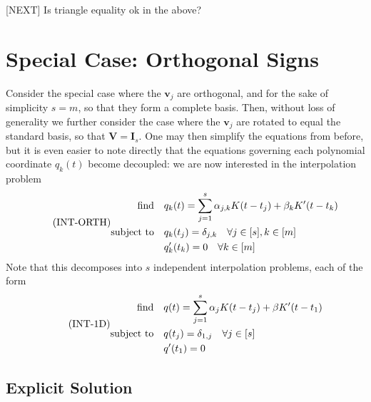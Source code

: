 \documentclass[11pt]{article}
\newcommand{\HS}{\hspace{3.5mm}}
\newcommand{\bV}{\bm V}
\newcommand{\bv}{\bm v}
\begin{document}
[NEXT] Is triangle equality ok in the above?

\section{Special Case: Orthogonal Signs}

Consider the special case where the $\bv_j$ are orthogonal, and for the sake of simplicity $s = m$, so that they form a complete basis.
Then, without loss of generality we further consider the case where the $\bv_j$ are rotated to equal the standard basis, so that $\bV = \bm I_s$.
One may then simplify the equations from before, but it is even easier to note directly that the equations governing each polynomial coordinate $q_k(t)$ become decoupled: we are now interested in the interpolation problem
\begin{equation}
    \tag{INT-ORTH}
    \begin{aligned}
  \text{find} &\HS q_k(t) = \sum_{j = 1}^s \alpha_{j, k} K(t - t_j) + \beta_kK^\prime(t - t_k) \\
  \text{subject to} &\HS q_k(t_j) = \delta_{j, k} \HS \forall j \in [s], k \in [m] \\
  &\HS q_k^\prime(t_k) = 0 \HS \forall k \in [m]
\end{aligned}
\end{equation}
Note that this decomposes into $s$ independent interpolation problems, each of the form
\begin{equation}
    \tag{INT-1D}
    \begin{aligned}
  \text{find} &\HS q(t) = \sum_{j = 1}^{s} \alpha_j K(t - t_j) + \beta K^\prime(t - t_1) \\
  \text{subject to}
              &\HS q(t_j) = \delta_{1,j} \HS \forall j \in [s] \\
              &\HS q^\prime(t_1) = 0
          \end{aligned}
\end{equation}

\subsection{Explicit Solution}
\end{document}

